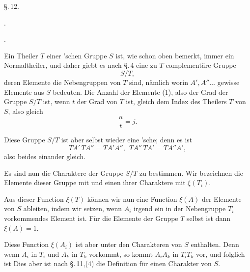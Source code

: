 
\begin{center}
\S.\,12.

.

.
\end{center}

Ein Theiler $T$ einer 'schen Gruppe $S$ ist, wie schon oben bemerkt, immer ein Normaltheiler, und daher giebt es nach \S.\,4 eine zu $T$ complementäre Gruppe
\[
S/T,
\]
deren Elemente die Nebengruppen von $T$ sind, nämlich
worin $A', A'' \ldots$ gewisse Elemente aus $S$ bedeuten. Die Anzahl der Elemente (1), also der Grad der Gruppe $S/T$ ist, wenn $t$ der Grad von $T$ ist, gleich dem Index des Theilers $T$ von $S$, also gleich
\[
\frac{n}{t} = j.
\]

Diese Gruppe $S/T$ ist aber selbst wieder eine 'sche; denn es ist
\[
TA'\,TA'' = TA'A'',\ \ TA''\,TA' = TA''A',
\]
also beides einander gleich.

Es sind nun die Charaktere der Gruppe $S/T$ zu bestimmen. Wir bezeichnen die Elemente dieser Gruppe mit
und einen ihrer Charaktere mit $\xi(T_i)$.

Aus dieser Function $\xi(T)$ können wir nun eine Function $\xi(A)$ der Elemente von $S$ ableiten, indem wir
setzen, wenn $A_i$ irgend ein in der Nebengruppe $T_i$ vorkommendes Element ist. Für die Elemente der Gruppe $T$ selbst ist dann $\xi(A) = 1$.

Diese Function $\xi(A_i)$ ist aber unter den Charakteren von $S$ enthalten. Denn wenn $A_i$ in $T_i$ und $A_k$ in $T_k$ vorkommt, so kommt $A_iA_k$ in $T_iT_k$ vor, und folglich ist
Dies aber ist nach \S.\,11,(4) die Definition für einen Charakter von $S$.
